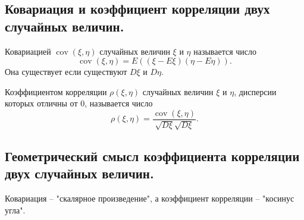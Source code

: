 \subsection{Ковариация и коэффициент корреляции двух случайных величин.}
\begin{definition}
    Ковариацией $\operatorname{cov}  (\xi, \eta)$ случайных величин $\xi$ и $\eta$ называется число
    \[
        \operatorname{cov} (\xi, \eta) = E((\xi - E \xi)(\eta - E \eta)).
    \]
    Она существует если существуют $D \xi $ и $D \eta$.
\end{definition}
\begin{definition}
    Коэффициентом корреляции $\rho(\xi, \eta)$ случайных величин $\xi$ и $\eta$, дисперсии которых отличны от 0, называется число
    \[
        \rho(\xi, \eta) = \frac{
            \operatorname{cov}  (\xi, \eta)
        }{
            \sqrt{D \xi} \sqrt{D \xi}
        }.
    \]
\end{definition}

\subsection{Геометрический смысл коэффициента корреляции двух случайных величин.}
Ковариация -- "скалярное произведение", а коэффициент корреляции -- "косинус угла".
